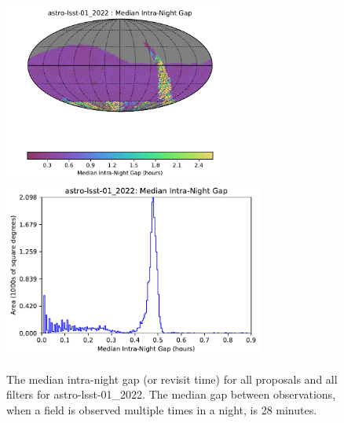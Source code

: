 \documentclass[DM,authoryear,toc]{lsstdoc}
\begin{document}
\begin{figure}[htb]
\centering
\vskip -0.0in
\includegraphics[height=2.3in]{figures/astro-lsst-01_2022_Median_Intra-Night_Gap_HEAL_SkyMap.pdf}
\includegraphics[height=2.3in]{figures/astro-lsst-01_2022-median_intra_night_gap_hist.pdf}
\vskip -0.1in
\caption{The median intra-night gap (or revisit time) for all proposals and all filters for astro-lsst-01\_2022.
The median gap between observations, when a field is observed multiple times in a night, is 28 minutes.
\label{fig:baseline_InterGapAll}}
\end{figure}
\end{document}

